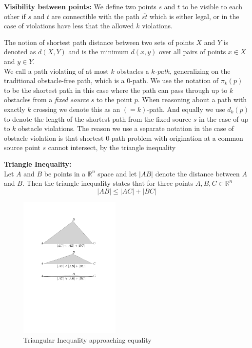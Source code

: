 \begin{mydef}
	\textbf{Visibility between points:}
    We define two points $s$ and $t$ to be visible to each other if $s$ and $t$ are 
    connectible with the path $\overline{st}$ which is either legal, or in the case 
    of violations have less that the allowed $k$ violations.
\end{mydef}

The notion of shortest path distance between two sets of points $X$ and $Y$ is 
denoted as $d(X,Y)$ and is the minimum $d(x,y)$ over all pairs of points $x\in X$ 
and $y \in Y$. \cite{HershbergerS99} \\

We call a path violating of at most $k$ obstacles a \textit{$k$-path}, generalizing 
on the traditional obstacle-free path, which is a 0-path. We use the notation of 
$\pi_k(p)$ to be the shortest path in this case where the path can pass through up 
to $k$ obstacles from a \textit{fixed source} $s$ to the point $p$. When reasoning 
about a path with exactly $k$ crossing we denote this as an $(=k)$-path. And 
equally we use $d_k(p)$ to denote the length of the shortest path from the fixed 
source $s$ in the case of up to $k$ obstacle violations. The reason we use a 
separate notation in the case of obstacle violation is that shortest 0-path 
problem with origination at a common source point $s$ cannot intersect, by the 
triangle inequality\cite{HershbergerKS17}

\begin{mydef}
	\textbf{Triangle Inequality:} \\ 
	Let $A$ and $B$ be points in a $\mathbb{R}^n$ space and let $|AB|$ denote
	the distance between $A$ and $B$.  Then the triangle inequality states that
	for three points $A,B,C\in\mathbb{R}^n$ \cite{metricspaceandpoints}
	$$|AB|\leq|AC|+|BC|$$
\end{mydef} 
\begin{figure}[H] 
	\centering
	\includegraphics[width=5cm]{figures/TriangularInequality.pdf}
	\caption{Triangular Inequality approaching equality}
	\label{fig:TriangularInequality} 
\end{figure}


